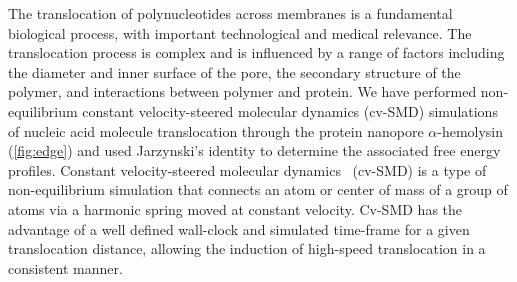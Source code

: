 \documentclass[a4paper,10pt]{article}
\begin{document}
The translocation of polynucleotides across membranes is a fundamental biological process, with important technological and medical relevance.  The translocation process is complex and is influenced by a range of factors including the diameter and inner surface of the pore, the secondary structure of the polymer, and interactions between polymer and protein. We have performed non-equilibrium constant velocity-steered molecular dynamics (cv-SMD) simulations of nucleic acid molecule translocation through the protein nanopore $\alpha$-hemolysin (\ref{fig:edge}) and used Jarzynski's identity%
to determine the associated free energy profiles. Constant velocity-steered molecular dynamics~\cite{namd} (cv-SMD) is a type of non-equilibrium simulation that connects an atom or center of mass of a group of atoms via a harmonic spring moved at constant velocity. Cv-SMD has the advantage of a well defined wall-clock and simulated time-frame for a given translocation distance, allowing the induction of high-speed translocation in a consistent manner.
\end{document}
